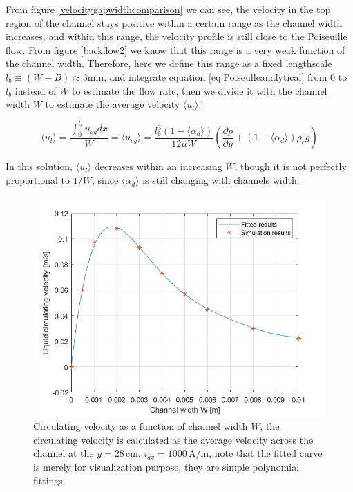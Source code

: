 From figure \ref{velocitygapwidthcomparison} we can see, the velocity in the top region of the channel stays positive within a certain range as the channel width increases, and within this range, the velocity profile is still close to the Poiseuille flow. From figure \ref{backflow2} we know that this range is a very weak function of the channel width. Therefore, here we define this range as a fixed lengthscale $l_b \equiv (W-B) \approx 3 \mathrm{mm}$, and integrate equation \ref{eq:Poiseulleanalytical} from 0 to $l_b$ instead of $W$ to estimate the flow rate, then we divide it with the channel width $W$ to estimate the average velocity $\langle u_l \rangle$:

\begin{equation}\label{eq:altanalytical}
    \langle u_l \rangle = \frac{\int_0^{l_b} u_{cy}dx}{W} = \langle u_{cy} \rangle =  \frac{l_b^3 (1-\langle \alpha_d \rangle)}{12\mu W} (\frac{\partial p}{\partial y} + (1-\langle \alpha_d \rangle)\rho_c g)
\end{equation}

In this solution, $\langle u_l \rangle$ decreases within an increasing $W$, though it is not perfectly proportional to $1/W$, since $\langle \alpha_d \rangle$ is still changing with channels width.

\begin{figure}[H]
    \centering
    \includegraphics[scale = 0.7]{circulatingvelocityprofile.png}
    \caption{Circulating velocity as a function of channel width $W$, the circulating velocity is calculated as the average velocity across the channel at the $y = 28 \, \mathrm{cm}$, $i_{av} = 1000 \, \mathrm{A/m}$, note that the fitted curve is merely for visualization purpose, they are simple polynomial fittings}
    \label{circulatingvelocityprofile}
\end{figure}


